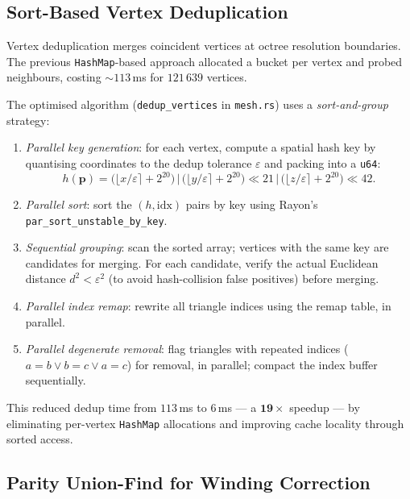 \documentclass[11pt]{article}
\begin{document}
\subsection{Sort-Based Vertex Deduplication}\label{sec:dedup}

Vertex deduplication merges coincident vertices at octree resolution
boundaries.  The previous \texttt{HashMap}-based approach allocated a
bucket per vertex and probed neighbours, costing $\sim 113$\,ms for
$121\,639$ vertices.

The optimised algorithm (\texttt{dedup\_vertices} in
\texttt{mesh.rs}) uses a \emph{sort-and-group} strategy:
\begin{enumerate}[leftmargin=2em]
  \item \emph{Parallel key generation}: for each vertex, compute a
        spatial hash key by quantising coordinates to the dedup
        tolerance $\varepsilon$ and packing into a \texttt{u64}:
        \begin{equation}
          h(\mathbf{p}) = \bigl(\lfloor x/\varepsilon \rceil + 2^{20}\bigr)
                        \,\big|\,\bigl(\lfloor y/\varepsilon \rceil + 2^{20}\bigr) \ll 21
                        \,\big|\,\bigl(\lfloor z/\varepsilon \rceil + 2^{20}\bigr) \ll 42.
        \end{equation}
  \item \emph{Parallel sort}: sort the $(h, \text{idx})$ pairs by
        key using Rayon's \texttt{par\_sort\_unstable\_by\_key}.
  \item \emph{Sequential grouping}: scan the sorted array; vertices
        with the same key are candidates for merging.  For each
        candidate, verify the actual Euclidean distance
        $d^2 < \varepsilon^2$ (to avoid hash-collision false positives)
        before merging.
  \item \emph{Parallel index remap}: rewrite all triangle indices
        using the remap table, in parallel.
  \item \emph{Parallel degenerate removal}: flag triangles with
        repeated indices ($a=b \vee b=c \vee a=c$) for removal, in
        parallel; compact the index buffer sequentially.
\end{enumerate}
This reduced dedup time from $113$\,ms to $6$\,ms --- a
$\mathbf{19\times}$ speedup --- by eliminating per-vertex
\texttt{HashMap} allocations and improving cache locality through
sorted access.

\subsection{Parity Union-Find for Winding Correction}\label{sec:parity-uf}
\end{document}
